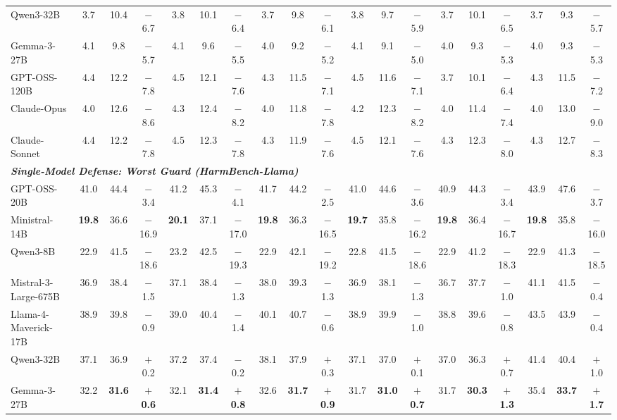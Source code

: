 \begin{table}[t]
{\begin{tabular}{l ccc ccc ccc ccc ccc ccc}
Qwen3-32B & 3.7 & 10.4 & $-$6.7 & 3.8 & 10.1 & $-$6.4 & 3.7 & 9.8 & $-$6.1 & 3.8 & 9.7 & $-$5.9 & 3.7 & 10.1 & $-$6.5 & 3.7 & 9.3 & $-$5.7 \\
Gemma-3-27B & 4.1 & 9.8 & $-$5.7 & 4.1 & 9.6 & $-$5.5 & 4.0 & 9.2 & $-$5.2 & 4.1 & 9.1 & $-$5.0 & 4.0 & 9.3 & $-$5.3 & 4.0 & 9.3 & $-$5.3 \\
GPT-OSS-120B & 4.4 & 12.2 & $-$7.8 & 4.5 & 12.1 & $-$7.6 & 4.3 & 11.5 & $-$7.1 & 4.5 & 11.6 & $-$7.1 & 3.7 & 10.1 & $-$6.4 & 4.3 & 11.5 & $-$7.2 \\
Claude-Opus & 4.0 & 12.6 & $-$8.6 & 4.3 & 12.4 & $-$8.2 & 4.0 & 11.8 & $-$7.8 & 4.2 & 12.3 & $-$8.2 & 4.0 & 11.4 & $-$7.4 & 4.0 & 13.0 & $-$9.0 \\
Claude-Sonnet & 4.4 & 12.2 & $-$7.8 & 4.5 & 12.3 & $-$7.8 & 4.3 & 11.9 & $-$7.6 & 4.5 & 12.1 & $-$7.6 & 4.3 & 12.3 & $-$8.0 & 4.3 & 12.7 & $-$8.3 \\
\midrule
\multicolumn{19}{l}{\textbf{\textit{Single-Model Defense: Worst Guard (HarmBench-Llama)}}} \\
GPT-OSS-20B & 41.0 & 44.4 & $-$3.4 & 41.2 & 45.3 & $-$4.1 & 41.7 & 44.2 & $-$2.5 & 41.0 & 44.6 & $-$3.6 & 40.9 & 44.3 & $-$3.4 & 43.9 & 47.6 & $-$3.7 \\
Ministral-14B & \textbf{19.8} & 36.6 & $-$16.9 & \textbf{20.1} & 37.1 & $-$17.0 & \textbf{19.8} & 36.3 & $-$16.5 & \textbf{19.7} & 35.8 & $-$16.2 & \textbf{19.8} & 36.4 & $-$16.7 & \textbf{19.8} & 35.8 & $-$16.0 \\
Qwen3-8B & 22.9 & 41.5 & $-$18.6 & 23.2 & 42.5 & $-$19.3 & 22.9 & 42.1 & $-$19.2 & 22.8 & 41.5 & $-$18.6 & 22.9 & 41.2 & $-$18.3 & 22.9 & 41.3 & $-$18.5 \\
Mistral-3-Large-675B & 36.9 & 38.4 & $-$1.5 & 37.1 & 38.4 & $-$1.3 & 38.0 & 39.3 & $-$1.3 & 36.9 & 38.1 & $-$1.3 & 36.7 & 37.7 & $-$1.0 & 41.1 & 41.5 & $-$0.4 \\
Llama-4-Maverick-17B & 38.9 & 39.8 & $-$0.9 & 39.0 & 40.4 & $-$1.4 & 40.1 & 40.7 & $-$0.6 & 38.9 & 39.9 & $-$1.0 & 38.8 & 39.6 & $-$0.8 & 43.5 & 43.9 & $-$0.4 \\
Qwen3-32B & 37.1 & 36.9 & $+$0.2 & 37.2 & 37.4 & $-$0.2 & 38.1 & 37.9 & $+$0.3 & 37.1 & 37.0 & $+$0.1 & 37.0 & 36.3 & $+$0.7 & 41.4 & 40.4 & $+$1.0 \\
Gemma-3-27B & 32.2 & \textbf{31.6} & \textbf{$+$0.6} & 32.1 & \textbf{31.4} & \textbf{$+$0.8} & 32.6 & \textbf{31.7} & \textbf{$+$0.9} & 31.7 & \textbf{31.0} & \textbf{$+$0.7} & 31.7 & \textbf{30.3} & \textbf{$+$1.3} & 35.4 & \textbf{33.7} & \textbf{$+$1.7} \\

\end{tabular}}
\end{table}
